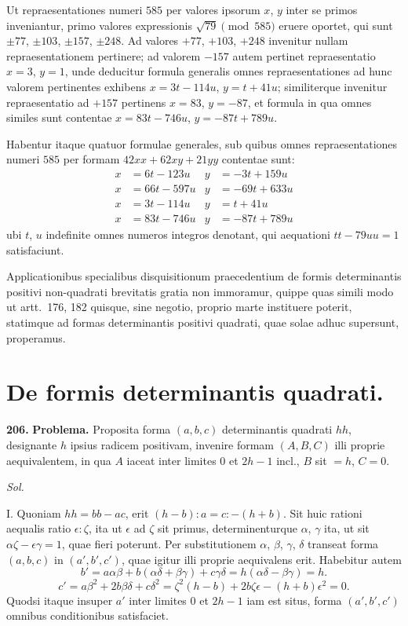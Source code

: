 \documentclass[12pt,a4paper]{article}
\theoremstyle{plain}
\theoremstyle{definition}
\theoremstyle{remark}
\begin{document}
Ut repraesentationes numeri $585$ per valores ipsorum $x$, $y$ inter se primos inveniantur, primo valores expressionis $\sqrt{79} \pmod{585}$ eruere oportet, qui sunt $\pm 77$, $\pm 103$, $\pm 157$, $\pm 248$. Ad valores $+77$, $+103$, $+248$ invenitur nullam repraesentationem pertinere; ad valorem $-157$ autem pertinet repraesentatio $x=3$, $y=1$, unde deducitur formula generalis omnes repraesentationes ad hunc valorem pertinentes exhibens $x=3t-114u$, $y=t+41u$; similiterque invenitur repraesentatio ad $+157$ pertinens $x=83$, $y=-87$, et formula in qua omnes similes sunt contentae $x=83t-746u$, $y=-87t+789u$.

Habentur itaque quatuor formulae generales, sub quibus omnes repraesentationes numeri $585$ per formam $42xx+62xy+21yy$ contentae sunt:
\begin{align*}
x &= 6t-123u & y &= -3t+159u \\
x &= 66t-597u & y &= -69t+633u \\
x &= 3t-114u & y &= t+41u \\
x &= 83t-746u & y &= -87t+789u
\end{align*}
ubi $t$, $u$ indefinite omnes numeros integros denotant, qui aequationi $tt-79uu=1$ satisfaciunt.

Applicationibus specialibus disquisitionum praecedentium de formis determinantis positivi non-quadrati brevitatis gratia non immoramur, quippe quas simili modo ut artt.\ 176, 182 quisque, sine negotio, proprio marte instituere poterit, statimque ad formas determinantis positivi quadrati, quae solae adhuc supersunt, properamus.


\section*{De formis determinantis quadrati.}

\textbf{206.}
\textbf{Problema.}
Proposita forma $(a,b,c)$ determinantis quadrati $hh$, designante $h$ ipsius radicem positivam, invenire formam $(A,B,C)$ illi proprie aequivalentem, in qua $A$ iaceat inter limites $0$ et $2h-1$ incl., $B$ sit $=h$, $C=0$.

\textit{Sol.}

I. Quoniam $hh=bb-ac$, erit $(h-b):a = c:-(h+b)$. Sit huic rationi aequalis ratio $\epsilon:\zeta$, ita ut $\epsilon$ ad $\zeta$ sit primus, determinenturque $\alpha$, $\gamma$ ita, ut sit $\alpha\zeta-\epsilon\gamma=1$, quae fieri poterunt. Per substitutionem $\alpha$, $\beta$, $\gamma$, $\delta$ transeat forma $(a,b,c)$ in $(a',b',c')$, quae igitur illi proprie aequivalens erit. Habebitur autem
\[
b' = a\alpha\beta+b(\alpha\delta+\beta\gamma)+c\gamma\delta = h(\alpha\delta-\beta\gamma) = h.
\]
\[
c' = a\beta^2+2b\beta\delta+c\delta^2 = \zeta^2(h-b)+2b\zeta\epsilon-(h+b)\epsilon^2 = 0.
\]
Quodsi itaque insuper $a'$ inter limites $0$ et $2h-1$ iam est situs, forma $(a',b',c')$ omnibus conditionibus satisfaciet.
\end{document}

